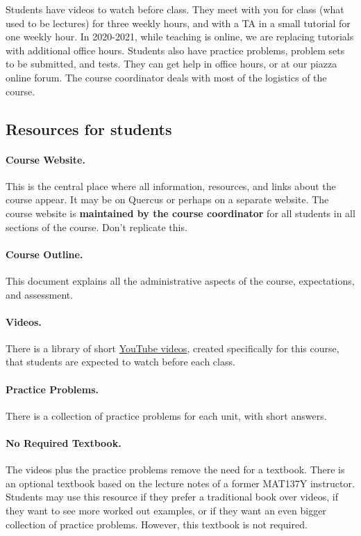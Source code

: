 \documentclass[11pt]{article}
\begin{document}
Students have videos to watch before class.  They meet with you for class (what used to be lectures) for three weekly hours, and with a TA in a small tutorial for one weekly hour. In 2020-2021, while teaching is online, we are replacing tutorials with additional office hours.  Students also have practice problems, problem sets to be submitted, and tests.  They can get help in office hours, or at our piazza online forum.  The course coordinator deals with most of the logistics of the course.

\subsection{Resources for students}

		\paragraph{Course Website.}  This is the central place where all information, resources, and links about the course appear. It may be on Quercus or perhaps on a separate website. The course website is \textbf{maintained by the course coordinator} for all students in all sections of the course.  Don't replicate this.
		\paragraph{Course Outline.}  This document explains all the administrative aspects of the course, expectations, and assessment.
		\paragraph{Videos.}  There is a library of short \href{https://www.youtube.com/channel/UCLzpR8AiHx9h_-yt2fAxd_A/playlists}{YouTube videos}, created specifically for this course, that students are expected to watch before each class.
		\paragraph{Practice Problems.}  There is a collection of practice problems for each unit, with short answers.
		\paragraph{No Required Textbook.}  The videos plus the practice problems remove the need for a textbook.     There is an optional textbook based on the lecture notes of a former MAT137Y instructor.  Students may use this resource if they prefer a traditional book over videos, if they want to see more worked out examples, or if they want an even bigger collection of practice problems.  However, this textbook is not required.
\end{document}

